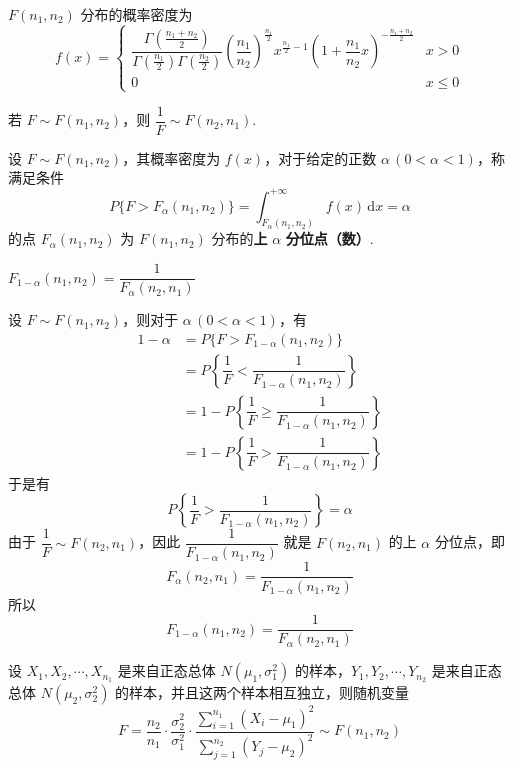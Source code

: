 $F(n_1, n_2)$ 分布的概率密度为
$$
f(x) = \begin{cases}
    \dfrac{\Gamma(\frac{n_1 + n_2}{2})}{\Gamma(\frac{n_1}{2}) \Gamma(\frac{n_2}{2})} \left( \dfrac{n_1}{n_2} \right)^{\frac{n_1}{2}} x^{\frac{n_1}{2} - 1} \left( 1 + \dfrac{n_1}{n_2} x \right)^{-\frac{n_1 + n_2}{2}} & x>0 \\[0.5em]
    0 & x \leqslant 0
\end{cases}
$$

若 $F \sim F(n_1, n_2)$，则 $\dfrac{1}{F} \sim F(n_2, n_1)$.

\begin{definition}
    设 $F \sim F(n_1, n_2)$，其概率密度为 $f(x)$，对于给定的正数 $\alpha \, (0 < \alpha < 1)$，称满足条件
    $$
    P \{ F > F_{\alpha}(n_1, n_2) \} = \int_{F_{\alpha}(n_1, n_2)}^{+\infty} f(x) \, \text{d}x = \alpha
    $$
    的点 $F_{\alpha}(n_1, n_2)$ 为 $F(n_1, n_2)$ 分布的\textbf{上} $\alpha$ \textbf{分位点（数）}.
\end{definition}

\setcounter{propertyname}{0}

\begin{property}
    $F_{1 - \alpha}(n_1, n_2) = \dfrac{1}{F_{\alpha}(n_2, n_1)}$
\end{property}

\begin{myproof}
    设 $F \sim F(n_1, n_2)$，则对于 $\alpha \, (0 < \alpha < 1)$，有
    $$
    \begin{aligned}
        1 - \alpha &= P \{ F > F_{1 - \alpha}(n_1, n_2) \} \\
        &= P \left\{ \dfrac{1}{F} < \dfrac{1}{F_{1 - \alpha}(n_1, n_2)} \right\} \\
        &= 1 - P \left\{ \dfrac{1}{F} \geqslant \dfrac{1}{F_{1 - \alpha}(n_1, n_2)} \right\} \\
        &= 1 - P \left\{ \dfrac{1}{F} > \dfrac{1}{F_{1 - \alpha}(n_1, n_2)} \right\}
    \end{aligned}
    $$
    于是有
    $$
    P \left\{ \dfrac{1}{F} > \dfrac{1}{F_{1 - \alpha}(n_1, n_2)} \right\} = \alpha
    $$
    由于 $\dfrac{1}{F} \sim F(n_2, n_1)$，因此 $\dfrac{1}{F_{1 - \alpha}(n_1, n_2)}$ 就是 $F(n_2, n_1)$ 的上 $\alpha$ 分位点，即
    $$
    F_{\alpha}(n_2, n_1) = \dfrac{1}{F_{1 - \alpha}(n_1, n_2)}
    $$
    所以
    $$
    F_{1 - \alpha}(n_1, n_2) = \dfrac{1}{F_{\alpha}(n_2, n_1)}
    $$
\end{myproof}

\begin{theorem}
    设 $X_1, X_2, \cdots, X_{n_1}$ 是来自正态总体 $N(\mu_1, \sigma_1^2)$ 的样本，$Y_1, Y_2, \cdots, Y_{n_2}$ 是来自正态总体 $N(\mu_2, \sigma_2^2)$ 的样本，并且这两个样本相互独立，则随机变量
    $$
    F = \dfrac{n_2}{n_1} \cdot \dfrac{\sigma_2^2}{\sigma_1^2} \cdot \dfrac{\displaystyle\sum_{i=1}^{n_1} (X_i - \mu_1)^2}{\displaystyle\sum_{j=1}^{n_2} (Y_j - \mu_2)^2} \sim F(n_1, n_2)
    $$
\end{theorem}

